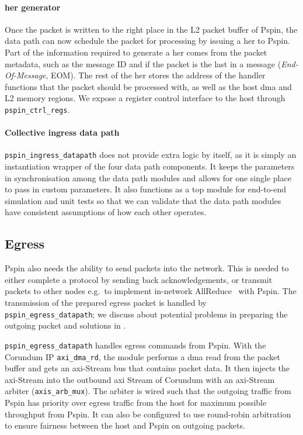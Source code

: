 \paragraph{\ac{her} generator} Once the packet is written to the right place in the L2 packet buffer of P\acs{spin}, the data path can now schedule the packet for processing by issuing a \ac{her} to P\acs{spin}.  Part of the information required to generate a \ac{her} comes from the packet metadata, such as the message ID and if the packet is the last in a message (\emph{End-Of-Message}, EOM).  The rest of the \ac{her} stores the address of the handler functions that the packet should be processed with, as well as the host \ac{dma} and L2 memory regions.  We expose a register control interface to the host through \texttt{pspin\_\-ctrl\_\-regs}.

\paragraph{Collective ingress data path} \texttt{pspin\_\-ingress\_\-datapath} does not provide extra logic by itself, as it is simply an instantiation wrapper of the four data path components.  It keeps the parameters in synchronisation among the data path modules and allows for one single place to pass in custom parameters.  It also functions as a top module for end-to-end simulation and unit tests so that we can validate that the data path modules have consistent assumptions of how each other operates.

\subsection{Egress}

P\acs{spin} also needs the ability to send packets into the network.  This is needed to either complete a protocol by sending back acknowledgements, or transmit packets to other nodes e.g.\ to implement in-network AllReduce~\cite{de_sensi_flare_2021} with P\acs{spin}.  The transmission of the prepared egress packet is handled by \texttt{pspin\_\-egress\_\-datapath}; we discuss about potential problems in preparing the outgoing packet and solutions in .

\texttt{pspin\_\-egress\_\-datapath} handles egress commands from P\acs{spin}.  With the Corundum IP \texttt{axi\_\-dma\_\-rd}, the module performs a \ac{dma} read from the packet buffer and gets an \ac{axi}-Stream bus that contains packet data.  It then injects the \ac{axi}-Stream into the outbound \ac{axi} Stream of Corundum with an \ac{axi}-Stream arbiter (\texttt{axis\_arb\_mux}).  The arbiter is wired such that the outgoing traffic from P\acs{spin} has priority over egress traffic from the host for maximum possible throughput from P\acs{spin}.  It can also be configured to use round-robin arbitration to ensure fairness between the host and P\acs{spin} on outgoing packets.

